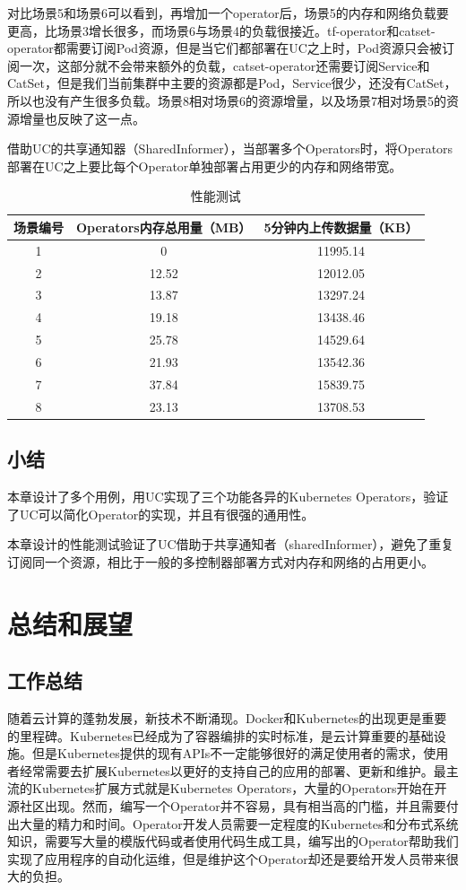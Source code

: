 \documentclass[macfonts,master]{njuthesis}
\begin{document}
对比场景5和场景6可以看到，再增加一个operator后，场景5的内存和网络负载要更高，比场景3增长很多，而场景6与场景4的负载很接近。tf-operator和catset-operator都需要订阅Pod资源，但是当它们都部署在UC之上时，Pod资源只会被订阅一次，这部分就不会带来额外的负载，catset-operator还需要订阅Service和CatSet，但是我们当前集群中主要的资源都是Pod，Service很少，还没有CatSet，所以也没有产生很多负载。场景8相对场景6的资源增量，以及场景7相对场景5的资源增量也反映了这一点。

借助UC的共享通知器（SharedInformer），当部署多个Operators时，将Operators部署在UC之上要比每个Operator单独部署占用更少的内存和网络带宽。
\begin{table}
  \centering
  \begin{tabular}{ccc}
    \toprule
    \textbf{场景编号} & \textbf{Operators内存总用量（MB）} & \textbf{5分钟内上传数据量（KB）} \\
    \midrule
    1  & 0 & 11995.14 \\
    2  & 12.52  &  12012.05 \\
    3  & 13.87  & 13297.24 \\
    4  & 19.18 &  13438.46 \\
    5  & 25.78  & 14529.64 \\
    6  & 21.93  & 13542.36 \\
    7  & 37.84  & 15839.75 \\
    8  & 23.13  & 13708.53 \\
    \bottomrule
  \end{tabular}
  \caption{性能测试}\label{table:test}
\end{table}

\section{小结}
本章设计了多个用例，用UC实现了三个功能各异的Kubernetes Operators，验证了UC可以简化Operator的实现，并且有很强的通用性。

本章设计的性能测试验证了UC借助于共享通知者（sharedInformer），避免了重复订阅同一个资源，相比于一般的多控制器部署方式对内存和网络的占用更小。
\chapter{总结和展望}\label{chapter_concludes}
\section{工作总结}
随着云计算的蓬勃发展，新技术不断涌现。Docker和Kubernetes的出现更是重要的里程碑。Kubernetes已经成为了容器编排的实时标准，是云计算重要的基础设施。但是Kubernetes提供的现有APIs不一定能够很好的满足使用者的需求，使用者经常需要去扩展Kubernetes以更好的支持自己的应用的部署、更新和维护。最主流的Kubernetes扩展方式就是Kubernetes Operators，大量的Operators开始在开源社区出现。然而，编写一个Operator并不容易，具有相当高的门槛，并且需要付出大量的精力和时间。Operator开发人员需要一定程度的Kubernetes和分布式系统知识，需要写大量的模版代码或者使用代码生成工具，编写出的Operator帮助我们实现了应用程序的自动化运维，但是维护这个Operator却还是要给开发人员带来很大的负担。
\end{document}
